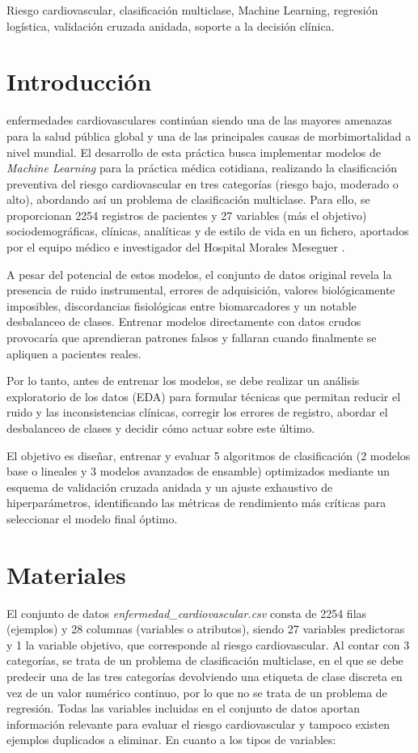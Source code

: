 \documentclass[journal,onecolumn]{IEEEtran}
\begin{document}
\begin{IEEEkeywords}
Riesgo cardiovascular, clasificación multiclase, Machine Learning, regresión logística, validación cruzada anidada, soporte a la decisión clínica.
\end{IEEEkeywords}


\section{Introducción}
 enfermedades cardiovasculares continúan siendo una de las mayores amenazas para la salud pública global y una de las principales causas de morbimortalidad a nivel mundial. El desarrollo de esta práctica busca implementar modelos de \textit{Machine Learning} para la práctica médica cotidiana, realizando la clasificación preventiva del riesgo cardiovascular en tres categorías (riesgo bajo, moderado o alto), abordando así un problema de clasificación multiclase. Para ello, se proporcionan 2254 registros de pacientes y 27 variables (más el objetivo) sociodemográficas, clínicas, analíticas y de estilo de vida en un fichero, aportados por el equipo médico e investigador del Hospital Morales Meseguer \cite{enunciado2026}.

A pesar del potencial de estos modelos, el conjunto de datos original revela la presencia de ruido instrumental, errores de adquisición, valores biológicamente imposibles, discordancias fisiológicas entre biomarcadores y un notable desbalanceo de clases. Entrenar modelos directamente con datos crudos provocaría que aprendieran patrones falsos y fallaran cuando finalmente se apliquen a pacientes reales.

Por lo tanto, antes de entrenar los modelos, se debe realizar un análisis exploratorio de los datos (EDA) para formular técnicas que permitan reducir el ruido y las inconsistencias clínicas, corregir los errores de registro, abordar el desbalanceo de clases y decidir cómo actuar sobre este último.

El objetivo es diseñar, entrenar y evaluar 5 algoritmos de clasificación (2 modelos base o lineales y 3 modelos avanzados de ensamble) optimizados mediante un esquema de validación cruzada anidada y un ajuste exhaustivo de hiperparámetros, identificando las métricas de rendimiento más críticas para seleccionar el modelo final óptimo.

\section{Materiales}
El conjunto de datos \textit{enfermedad\_cardiovascular.csv} consta de 2254 filas (ejemplos) y 28 columnas (variables o atributos), siendo 27 variables predictoras y 1 la variable objetivo, que corresponde al riesgo cardiovascular. Al contar con 3 categorías, se trata de un problema de clasificación multiclase, en el que se debe predecir una de las tres categorías devolviendo una etiqueta de clase discreta en vez de un valor numérico continuo, por lo que no se trata de un problema de regresión. Todas las variables incluidas en el conjunto de datos aportan información relevante para evaluar el riesgo cardiovascular y tampoco existen ejemplos duplicados a eliminar. En cuanto a los tipos de variables:
\end{document}
